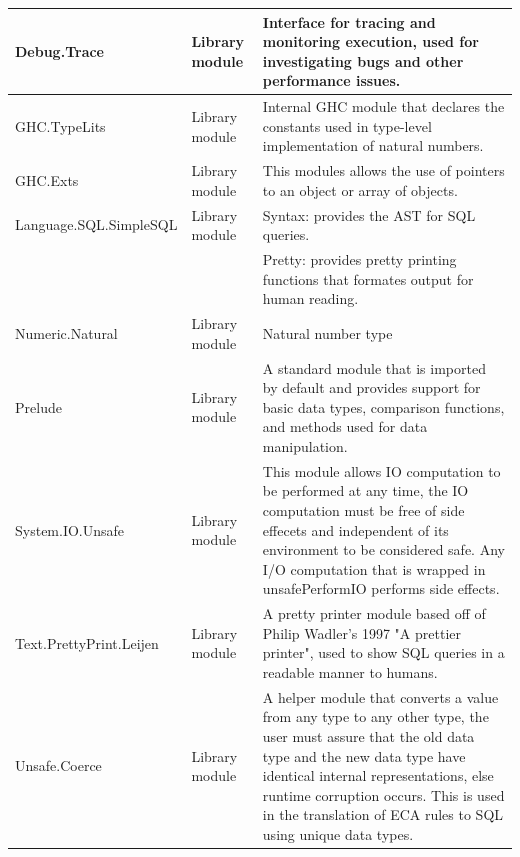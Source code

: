 \documentclass[12pt]{report}
\begin{document}
\begin{longtable}{ |m{4.5cm}|m{1.5cm}|m{7cm}|  }
    Debug.Trace & Library module & Interface for tracing and monitoring 
    execution, used for investigating bugs and other performance issues.  \\ 
    \hline
    GHC.TypeLits & Library module & Internal GHC module that declares the 
    constants used in type-level implementation of natural numbers.  \\ 
    \hline    
    GHC.Exts & Library module & This modules allows the use of pointers to an 
    object or array of objects.  \\ \hline    
    Language.SQL.SimpleSQL & Library module & Syntax: provides the AST for SQL 
    queries. \\& & Pretty: provides pretty printing functions that formates 
    output for human reading. \\ \hline            
    Numeric.Natural & Library module & Natural number type  \\ \hline    
    Prelude & Library module & A standard module that is imported by default 
    and provides support for basic data types, comparison functions, and 
    methods used for data manipulation.   \\ \hline
    System.IO.Unsafe & Library module & This module allows IO computation to be 
    performed at any time, the IO computation must be free of side effecets and 
    independent of its environment to be considered safe. Any I/O computation 
    that is wrapped in unsafePerformIO performs side effects.  \\ \hline
    Text.PrettyPrint.Leijen & Library module & A pretty printer module based 
    off of Philip Wadler's 1997 "A prettier printer", used to show SQL queries 
    in a readable manner to humans.  \\ \hline        
    Unsafe.Coerce & Library module & A helper module that converts a value from 
    any type to any other type, the user must assure that the old data type and 
    the new data type have identical internal representations, else runtime 
    corruption occurs. This is used in the translation of ECA rules to SQL 
    using unique data types.  \\ 
    \hline  
\end{longtable}
\end{document}
